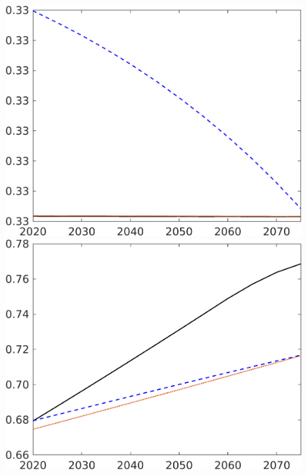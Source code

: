 \begin{figure}[h!!]
\begin{minipage}[]{0.32\textwidth}
	\end{minipage}
	\begin{minipage}[]{0.32\textwidth}
		\includegraphics[width=1\textwidth]{../../codding_model/own_basedOnFried/optimalPol_elastS_DisuSci/figures/all_1705/hl_CompEffOPT_NOT_NoTaus_spillover0_sep1_BN0_ineq0_red0_etaa0.79_lgd0.png}
	\end{minipage}
	\begin{minipage}[]{0.32\textwidth}
		\includegraphics[width=1\textwidth]{../../codding_model/own_basedOnFried/optimalPol_elastS_DisuSci/figures/all_1705/C_CompEffOPT_NOT_NoTaus_spillover0_sep1_BN0_ineq0_red0_etaa0.79_lgd0.png}

\end{minipage}
\end{figure}
